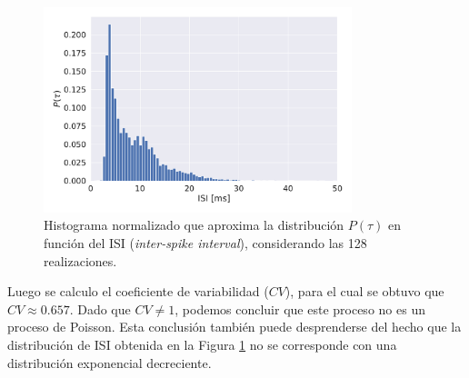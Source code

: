 \begin{figure}[h!]
    \centering
    \includegraphics[width=0.8\textwidth]{1_Distr_ISI.pdf}
    \caption{Histograma normalizado que aproxima la distribución $P(\tau)$ en función del ISI (\textit{inter-spike interval}), considerando las 128 realizaciones.}
    \label{01:fig:histograma}
\end{figure}

Luego se calculo el coeficiente de variabilidad ($CV$), para el cual se obtuvo que $CV\approx0.657$. Dado que $CV \neq 1$, podemos concluir que este proceso no es un proceso de Poisson. Esta conclusión también puede desprenderse del hecho que la distribución de ISI obtenida en la Figura \ref{01:fig:histograma} no se corresponde con una distribución exponencial decreciente.